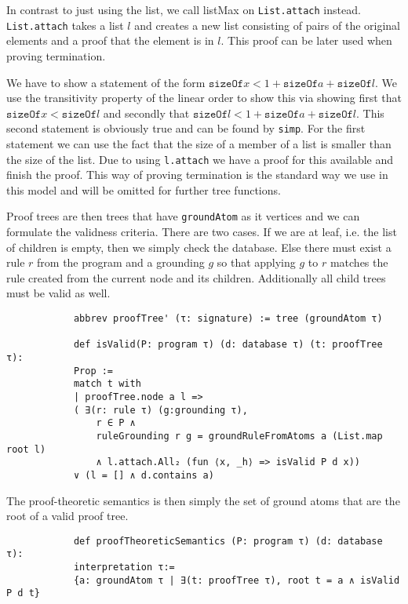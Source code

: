 \documentclass{article}
\begin{document}
        In contrast to just using the list, we call listMax on \texttt{List.attach} instead. \texttt{List.attach} takes a list $l$ and creates a new list consisting of pairs of the original elements and a proof that the element is in $l$. This proof can be later used when proving termination.

        We have to show a statement of the form $\mathtt{sizeOf} x < 1 + \mathtt{sizeOf} a + \mathtt{sizeOf} l$. We use the transitivity property of the linear order to show this via showing first that $\mathtt{sizeOf} x < \mathtt{sizeOf} l$ and secondly that $\mathtt{sizeOf} l < 1 + \mathtt{sizeOf} a + \mathtt{sizeOf} l$. This second statement is obviously true and can be found by \texttt{simp}. For the first statement we can use the fact that the size of a member of a list is smaller than the size of the list. Due to using \texttt{l.attach} we have a proof for this available and finish the proof.
        This way of proving termination is the standard way we use in this model and will be omitted for further tree functions.

        Proof trees are then trees that have \texttt{groundAtom} as it vertices and we can formulate the validness criteria. There are two cases. If we are at leaf, i.e. the list of children is empty, then we simply check the database. Else there must exist a rule $r$ from the program and a grounding $g$ so that applying $g$ to $r$ matches the rule created from the current node and its children. Additionally all child trees must be valid as well.

        \begin{lstlisting}
            abbrev proofTree' (τ: signature) := tree (groundAtom τ)

            def isValid(P: program τ) (d: database τ) (t: proofTree τ): 
            Prop :=
            match t with
            | proofTree.node a l => 
            ( ∃(r: rule τ) (g:grounding τ), 
                r ∈ P ∧ 
                ruleGrounding r g = groundRuleFromAtoms a (List.map root l)
                ∧ l.attach.All₂ (fun ⟨x, _h⟩ => isValid P d x)) 
            ∨ (l = [] ∧ d.contains a)
        \end{lstlisting}

        The proof-theoretic semantics is then simply the set of ground atoms that are the root of a valid proof tree.

        \begin{lstlisting}
            def proofTheoreticSemantics (P: program τ) (d: database τ): 
            interpretation τ:= 
            {a: groundAtom τ | ∃(t: proofTree τ), root t = a ∧ isValid P d t}
        \end{lstlisting}
\end{document}
